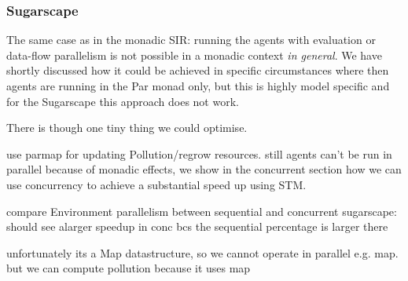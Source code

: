 \subsubsection{Sugarscape}
The same case as in the monadic SIR: running the agents with evaluation or data-flow parallelism is not possible in a monadic context  \textit{in general}. We have shortly discussed how it could be achieved in specific circumstances where then agents are running in the Par monad only, but this is highly model specific and for the Sugarscape this approach does not work. 

There is though one tiny thing we could optimise.

use parmap for updating Pollution/regrow resources. still agents can't be run in parallel because of monadic effects, we show in the concurrent section how we can use concurrency to achieve a substantial speed up using STM.

compare Environment parallelism between sequential and concurrent sugarscape: should see alarger speedup in conc bcs the sequential percentage is larger there

unfortunately its a Map datastructure, so we cannot operate in parallel e.g. map. but we can compute pollution because it uses map




